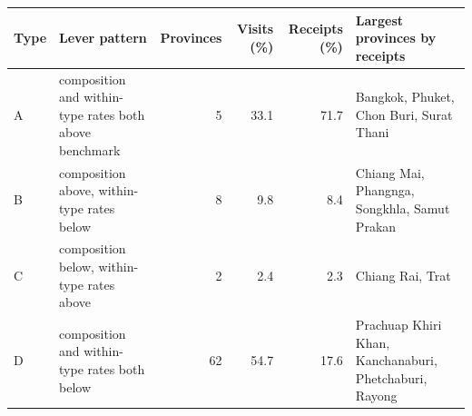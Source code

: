 \begin{tabular}{llrrrp{5.2cm}}
\toprule
Type & Lever pattern & Provinces & Visits (\%) & Receipts (\%) & Largest provinces by receipts \\
\midrule
A & composition and within-type rates both above benchmark & 5 & 33.1 & 71.7 & Bangkok, Phuket, Chon Buri, Surat Thani \\
B & composition above, within-type rates below & 8 & 9.8 & 8.4 & Chiang Mai, Phangnga, Songkhla, Samut Prakan \\
C & composition below, within-type rates above & 2 & 2.4 & 2.3 & Chiang Rai, Trat \\
D & composition and within-type rates both below & 62 & 54.7 & 17.6 & Prachuap Khiri Khan, Kanchanaburi, Phetchaburi, Rayong \\
\bottomrule
\end{tabular}

